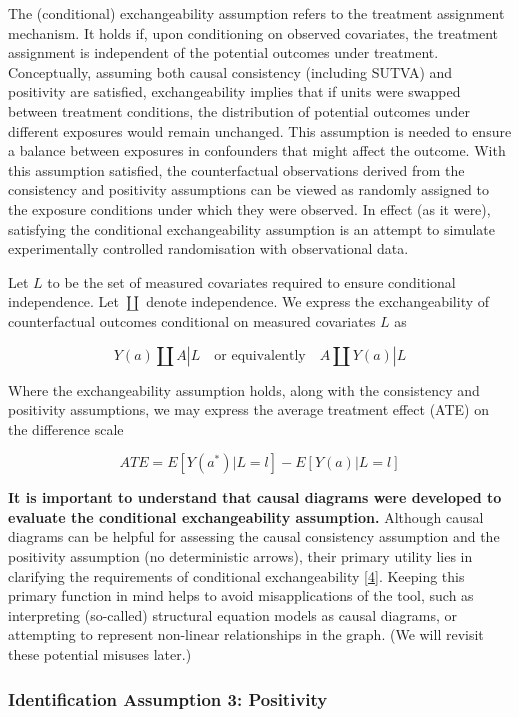 \documentclass[
  singlecolumn]{article}
\begin{document}
The (conditional) exchangeability assumption refers to the treatment
assignment mechanism. It holds if, upon conditioning on observed
covariates, the treatment assignment is independent of the potential
outcomes under treatment. Conceptually, assuming both causal consistency
(including SUTVA) and positivity are satisfied, exchangeability implies
that if units were swapped between treatment conditions, the
distribution of potential outcomes under different exposures would
remain unchanged. This assumption is needed to ensure a balance between
exposures in confounders that might affect the outcome. With this
assumption satisfied, the counterfactual observations derived from the
consistency and positivity assumptions can be viewed as randomly
assigned to the exposure conditions under which they were observed. In
effect (as it were), satisfying the conditional exchangeability
assumption is an attempt to simulate experimentally controlled
randomisation with observational data.

Let \(L\) to be the set of measured covariates required to ensure
conditional independence. Let \(\coprod\) denote independence. We
express the exchangeability of counterfactual outcomes conditional on
measured covariates \(L\) as

\[
Y(a) \coprod  A|L \quad \text{or equivalently} \quad A \coprod  Y(a)|L
\]

Where the exchangeability assumption holds, along with the consistency
and positivity assumptions, we may express the average treatment effect
(ATE) on the difference scale

\[
ATE = E[Y(a^*)|L = l] - E[Y(a)|L = l]
\]

\textbf{It is important to understand that causal diagrams were
developed to evaluate the conditional exchangeability assumption.}
Although causal diagrams can be helpful for assessing the causal
consistency assumption and the positivity assumption (no deterministic
arrows), their primary utility lies in clarifying the requirements of
conditional exchangeability
{[}\protect\hyperlink{ref-hernuxe1n2023}{4}{]}. Keeping this primary
function in mind helps to avoid misapplications of the tool, such as
interpreting (so-called) structural equation models as causal diagrams,
or attempting to represent non-linear relationships in the graph. (We
will revisit these potential misuses later.)

\hypertarget{identification-assumption-3-positivity}{%
\subsubsection{Identification Assumption 3:
Positivity}\label{identification-assumption-3-positivity}}
\end{document}
